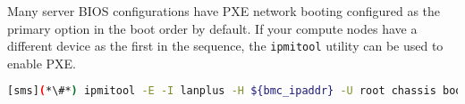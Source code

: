 \begin{center}
\begin{tcolorbox}[]
\small Many server BIOS configurations have PXE network booting configured
as the primary option in the boot order by default. If your compute nodes have
a different device as the first in the sequence, the \texttt{ipmitool} utility
can be used to enable PXE.
\begin{lstlisting}[language=bash]
[sms](*\#*) ipmitool -E -I lanplus -H ${bmc_ipaddr} -U root chassis bootdev pxe options=persistent
\end{lstlisting}
\end{tcolorbox}
\end{center}
